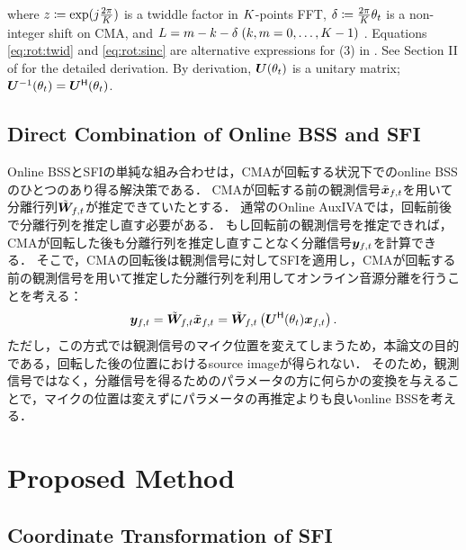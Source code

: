 \documentclass[sip,biber]{now-journal}
\begin{document}
where $z \coloneqq \exp (j \frac{2\pi}{K})$ is a twiddle factor in $K$-points FFT,
$\delta \coloneqq \frac{2\pi}{K} \theta _{t}$ is a non-integer shift on CMA,
and $L = m - k - \delta\; (k, m = 0, \dots, K - 1)$ \cite{Wakabayashi:2023:ASLP}.
Equations \eqref{eq:rot:twid} and \eqref{eq:rot:sinc} are alternative expressions for (3) in \cite{Wakabayashi:2023:ASLP}.
See Section II of \cite{Wakabayashi:2023:ASLP} for the detailed derivation.
By derivation, $\bm{U} (\theta _{t})$ is a unitary matrix; $\bm{U} ^{-1} (\theta _{t}) = \bm{U} ^{\mathsf{H}} (\theta _{t})$.

\subsection{Direct Combination of Online BSS and SFI}

Online BSSとSFIの単純な組み合わせは，CMAが回転する状況下でのonline BSSのひとつのあり得る解決策である．
CMAが回転する前の観測信号$\refpos{\Obs} _{\ft}$を用いて分離行列$\refpos{\Demix} _{\ft}$が推定できていたとする．
通常のOnline AuxIVAでは，回転前後で分離行列を推定し直す必要がある．
もし回転前の観測信号を推定できれば，CMAが回転した後も分離行列を推定し直すことなく分離信号$\Est _{\ft}$を計算できる．
そこで，CMAの回転後は観測信号に対してSFIを適用し，CMAが回転する前の観測信号を用いて推定した分離行列を利用してオンライン音源分離を行うことを考える：
\begin{equation}
  \Est _{\ft} = \refpos{\Demix} _{\ft} \refpos{\Obs} _{\ft} = \refpos{\Demix} _{\ft} \left(\rotMat ^{\hermite} (\rotSpat _{\tframe}) \Obs _{\ft}\right).
\end{equation}
ただし，この方式では観測信号のマイク位置を変えてしまうため，本論文の目的である，回転した後の位置におけるsource imageが得られない．
そのため，観測信号ではなく，分離信号を得るためのパラメータの方に何らかの変換を与えることで，マイクの位置は変えずにパラメータの再推定よりも良いonline BSSを考える．

\section{Proposed Method}\label{sec:proposed}
\subsection{Coordinate Transformation of SFI}
\end{document}

